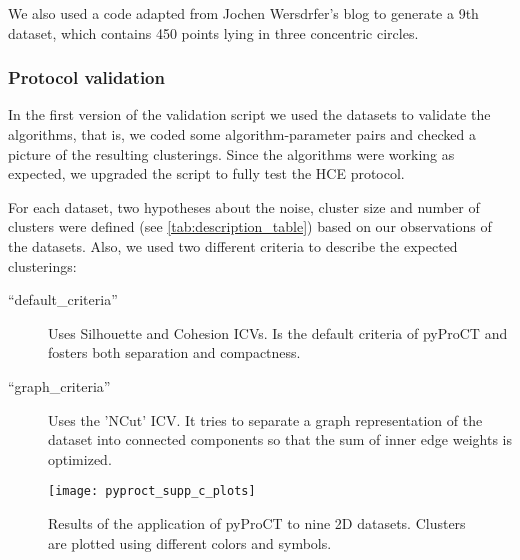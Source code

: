 We also used a code adapted from Jochen Wersdrfer's blog \cite{wersdorfer_spectral_????}
to generate a 9th dataset, which contains 450 points lying in three
concentric circles.


\subsubsection{Protocol validation}

In the first version of the validation script we used the datasets
to validate the algorithms, that is, we coded some algorithm-parameter
pairs and checked a picture of the resulting clusterings. Since the
algorithms were working as expected, we upgraded the script to fully
test the HCE protocol.

For each dataset, two hypotheses about the noise, cluster size and
number of clusters were defined (see \ref{tab:description_table})
based on our observations of the datasets. Also, we used two different
criteria to describe the expected clusterings:

\begin{description}
	\item [``default\_criteria''] Uses Silhouette and Cohesion ICVs. Is
	the default criteria of pyProCT and fosters both separation and compactness.
	\item [``graph\_criteria''] Uses the 'NCut' ICV. It tries to separate
	a graph representation of the dataset into connected components so
	that the sum of inner edge weights is optimized.
\end{description}

\begin{figure}
	\texttt{[image: pyproct\_supp\_c\_plots]}

	\protect\caption{Results of the application of pyProCT to nine 2D datasets. Clusters
	are plotted using different colors and symbols.\label{fig:plots_2d}}

\end{figure}

